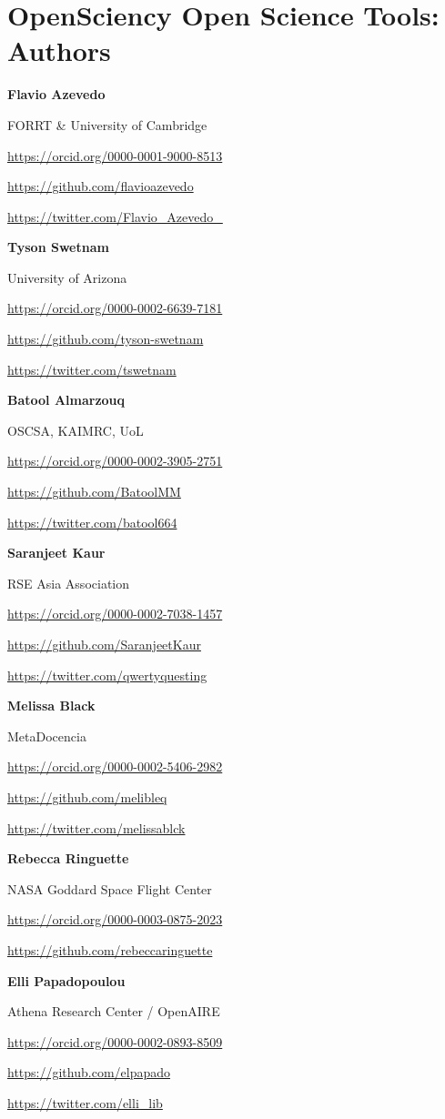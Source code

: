 \documentclass[
  letterpaper,
  DIV=11,
  numbers=noendperiod]{scrreport}
\begin{document}
\hypertarget{opensciency-open-science-tools-authors}{%
\chapter{OpenSciency Open Science Tools:
Authors}\label{opensciency-open-science-tools-authors}}

\textbf{Flavio Azevedo}

FORRT \& University of Cambridge

\url{https://orcid.org/0000-0001-9000-8513}

\url{https://github.com/flavioazevedo}

\url{https://twitter.com/Flavio_Azevedo_}

\textbf{Tyson Swetnam}

University of Arizona

\url{https://orcid.org/0000-0002-6639-7181}

\url{https://github.com/tyson-swetnam}

\url{https://twitter.com/tswetnam}

\textbf{Batool Almarzouq}

OSCSA, KAIMRC, UoL

\url{https://orcid.org/0000-0002-3905-2751}

\url{https://github.com/BatoolMM}

\url{https://twitter.com/batool664}

\textbf{Saranjeet Kaur}

RSE Asia Association

\url{https://orcid.org/0000-0002-7038-1457}

\url{https://github.com/SaranjeetKaur}

\url{https://twitter.com/qwertyquesting}

\textbf{Melissa Black}

MetaDocencia

\url{https://orcid.org/0000-0002-5406-2982}

\url{https://github.com/melibleq}

\url{https://twitter.com/melissablck}

\textbf{Rebecca Ringuette}

NASA Goddard Space Flight Center

\url{https://orcid.org/0000-0003-0875-2023}

\url{https://github.com/rebeccaringuette}

\textbf{Elli Papadopoulou}

Athena Research Center / OpenAIRE

\url{https://orcid.org/0000-0002-0893-8509}

\url{https://github.com/elpapado}

\url{https://twitter.com/elli_lib}
\end{document}
